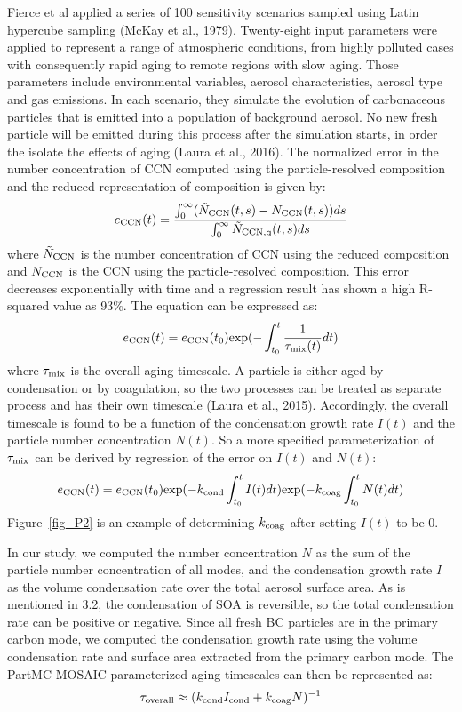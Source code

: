 \documentclass[12pt]{article}
\begin{document}
		Fierce et al applied a series of 100 sensitivity scenarios sampled using Latin hypercube sampling (McKay et al., 1979). Twenty-eight input parameters were applied to represent a range of atmospheric conditions, from highly polluted cases with consequently rapid aging to remote regions with slow aging. Those parameters include environmental variables, aerosol characteristics, aerosol type and gas emissions. In each scenario, they simulate the evolution of carbonaceous particles that is emitted into a population of background aerosol. No new fresh particle will be emitted during this process after the simulation starts, in order the isolate the effects of aging (Laura et al., 2016). The normalized error in the number concentration of CCN computed using the particle-resolved composition and the reduced representation of composition is given by:
		\begin{align}\label{eq:11}
		e_{\rm CCN}(t) = \frac{\int_{0}^{\infty}( \tilde{N}_{\rm CCN}(t,s) - 
			N_{\rm CCN} (t,s))ds}{\int_{0}^{\infty} \tilde{N}_{\rm CCN, q}(t,s)ds}
		\end{align}
		where $\tilde{N}_{\rm CCN}$ is the number concentration of CCN using the reduced composition and $N_{\rm CCN}$ is the CCN using the particle-resolved composition. This error decreases exponentially with time and a regression result has shown a high R-squared value as 93$\%$. The equation can be expressed as:
		\begin{align}
		e_{\rm CCN}(t) = e_{\rm CCN}(t_{0})\text{exp}(-\int_{t_{0}}^{t}\frac{1}{\tau_{\rm mix}(t)} dt) 
		\end{align}
		where $\tau_{\rm mix}$ is the overall aging timescale. 
		A particle is either aged by condensation or by coagulation, so the two processes can be treated as separate process and has their own timescale (Laura et al., 2015). Accordingly, the overall timescale is found to be a function of the condensation growth rate $I(t)$ and the particle number concentration $N(t)$.
		So a more specified parameterization of $\tau_{\rm mix}$ can be derived by regression of the error on $I(t)$ and $N(t)$:
		\begin{align}
		e_{\rm CCN}(t) = e_{\rm CCN}(t_{0})\text{exp}(-k_{\rm cond}\int_{t_{0}}^{t} I(t) dt)\text{exp}(-k_{\rm coag}\int_{t_{0}}^{t}N(t) dt) 
		\end{align}
		Figure~\ref{fig_P2} is an example of determining $k_{\rm coag}$ after setting $I(t)$ to be 0. 
		
		In our study, we computed the number concentration $N$ as the sum of the particle number concentration of all modes, and the condensation growth rate $I$ as the volume condensation rate over the total aerosol surface area. As is mentioned in 3.2, the condensation of SOA is reversible, so the total condensation rate can be positive or negative. Since all fresh BC particles are in the primary carbon mode, we computed the condensation growth rate using the volume condensation rate and surface area extracted from the primary carbon mode. The PartMC-MOSAIC parameterized aging timescales can then be represented as:
		\begin{align}
		\tau_{\rm overall} \approx (k_{\rm cond}I_{\rm cond} + k_{\rm coag}N)^{-1}
		\end{align}
		
\end{document}

